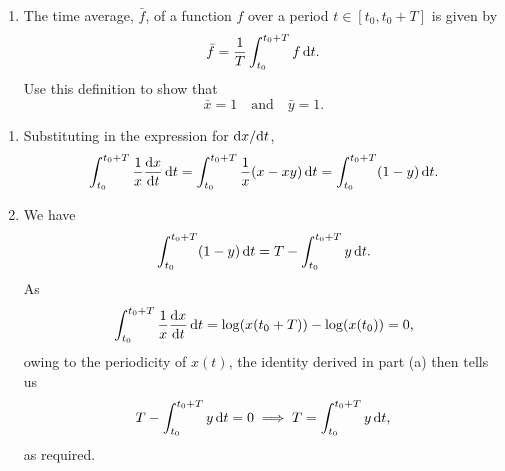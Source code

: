 \documentclass[a4paper, 12pt]{article}
\begin{document}
\begin{enumerate}[label={\bf \arabic{*}.\;}, ref={\arabic{*}},itemsep=3ex, left=0ex]
{\begin{enumerate}[label=(\alph{*})]
        \item The time average, $\bar{f}$, of a function $f$ over a period $t \in [t_{0},t_{0}+T]$ is given by
          \begin{equation}
            \bar{f}= \frac{1}{T}\int_{t_0}^{t_0+T}f \,{\mathrm d}{t}.
          \end{equation}
          Use this definition to show that
          \begin{equation}
            \bar{x}= 1 \quad \text{and}\quad \bar{y}= 1.
          \end{equation}
      \end{enumerate}
    }
    {
      \begin{enumerate}[label=(\alph*)]
        \item Substituting in the expression for $\fd{x}{t}$,
          \begin{equation}
            \int_{t_0}^{t_0+T}\frac{1}{x}\fd{x}{t}\,\d{t} = \int_{t_0}^{t_0+T}\frac{1}{x}(x - x y)\,\d{t} = \int_{t_0}^{t_0+T}(1 - y)\,\d{t}.
          \end{equation}

        \item We have
          \begin{equation}
            \int_{t_0}^{t_0+T}(1 - y)\,{\mathrm d}{t} = T - \int_{t_0}^{t_0+T}y \,{\mathrm d} t.
          \end{equation}
          As
          \begin{equation}
            \label{periodvanish}
            \int_{t_0}^{t_0+T}\frac{1}{x}\fd{x}{t}\,\d{t} = \log(x(t_0+T))-\log(x(t_0)) = 0,
          \end{equation}
          owing to the periodicity of $x(t)$, the identity derived in part (a) then tells us
          \begin{equation}
            \label{Tiden1}
            T - \int_{t_0}^{t_0+T}y\,{\mathrm d} t = 0 \implies T =  \int_{t_0}^{t_0+T}y\,{\mathrm d}{t},
          \end{equation}
          as required.


\end{enumerate}}
\end{enumerate}
\end{document}
